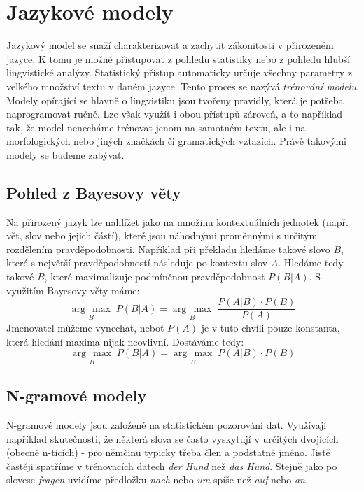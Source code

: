 \documentclass[12pt,a4paper]{report}
\newcommand{\argmax}[1]{\underset{#1}{\operatorname{arg}\,\operatorname{max}}\;}
\begin{document}
\chapter{Jazykové modely}
Jazykový model se snaží charakterizovat a zachytit zákonitosti v přirozeném jazyce. K tomu je možné přistupovat z pohledu statistiky nebo z pohledu hlubší lingvistické analýzy. Statistický přístup automaticky určuje všechny parametry z velkého množství textu v daném jazyce. Tento proces se nazývá \textit{trénování modelu}. Modely opírající se hlavně o lingvistiku jsou tvořeny pravidly, která je potřeba naprogramovat ručně. Lze však využít i obou přístupů zároveň, a to například tak, že model nenecháme trénovat jenom na samotném textu, ale i na morfologických nebo jiných značkách či gramatických vztazích. Právě takovými modely se budeme zabývat.

\section{Pohled z Bayesovy věty}
Na přirozený jazyk lze nahlížet jako na množinu kontextuálních jednotek (např. vět, slov nebo jejich částí), které jsou náhodnými proměnnými s určitým rozdělením pravděpodobnosti. Například při překladu hledáme takové slovo \(B\), které s největší pravděpodobností následuje po kontextu slov \(A\). Hledáme tedy takové \(B\), které maximalizuje podmíněnou pravděpodobnost \(P(B|A)\). S využitím Bayesovy věty máme:
\begin{equation}
\argmax{B} P(B|A) = \argmax{B} \frac{P(A|B) \cdot P(B)}{P(A)} 
\end{equation}
Jmenovatel můžeme vynechat, neboť \(P(A)\) je v tuto chvíli pouze konstanta, která hledání maxima nijak neovlivní. Dostáváme tedy:
\begin{equation}
\argmax{B} P(B|A) = \argmax{B} P(A|B) \cdot P(B)
\end{equation}

\section{N-gramové modely}
N-gramové modely jsou založené na statistickém pozorování dat. Využívají například skutečnosti, že některá slova se často vyskytují v určitých dvojících (obecně n-ticích) - pro němčinu typicky třeba člen a podstatné jméno. Jistě častěji spatříme v trénovacích datech \textit{der Hund} než \textit{das Hund}. Stejně jako po slovese \textit{fragen} uvidíme předložku \textit{nach} nebo \textit{um} spíše než \textit{auf} nebo \textit{an}.
\end{document}
